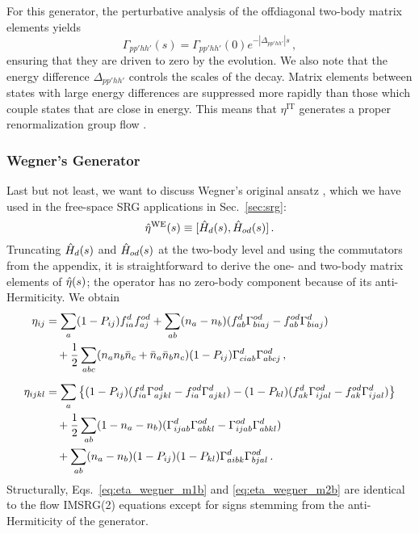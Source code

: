 {For this generator, the perturbative analysis of the offdiagonal 
two-body matrix elements yields
\begin{equation}
  \Gamma_{pp'hh'}(s) = \Gamma_{pp'hh'}(0) e^{-|\Delta_{pp'hh'}|s}\,,
\end{equation}
ensuring that they are driven to zero by the evolution. We also
note that the energy difference $\Delta_{pp'hh'}$ controls
the scales of the decay. Matrix elements between states with large 
energy differences are suppressed more rapidly than those which
couple states that are close in energy. This means that $\eta^\text{IT}$ 
generates a proper renormalization group flow \cite{Kehrein:2006kx,Hergert:2016jk}.


%
%
\subsubsection{\label{sec:imsrg_generator_wegner}Wegner's Generator}
Last but not least, we want to discuss Wegner's original ansatz 
\cite{Wegner:1994dk}, which we have used in the free-space SRG applications 
in Sec.~\ref{sec:srg}:
\begin{equation}\label{eq:eta_wegner}
  \etaO^\text{WE}(s) \equiv \comm{\HO_d(s)}{\HO_{od}(s)}\,.
\end{equation}
Truncating $\hat{H}_d(s)$ and $\hat{H}_{od}(s)$ at the two-body level and using
the commutators from the appendix, it is straightforward to derive the 
one- and two-body matrix elements of $\hat{\eta}(s)$; the operator has no
zero-body component because of its anti-Hermiticity. We obtain
\begin{align}
  \eta_{ij} &= 
  \sum_{a}(1-P_{ij})f^d_{ia}f^{od}_{aj} +\sum_{ab}(n_a-n_b)(f^d_{ab}\Gamma^{od}_{biaj}-f^{od}_{ab}\Gamma^d_{biaj}) \notag\\ 
  &\quad +\frac{1}{2} \sum_{abc}(n_an_b\bar{n}_c+\bar{n}_a\bar{n}_bn_c) (1-P_{ij})\Gamma^d_{ciab}\Gamma^{od}_{abcj}
  \label{eq:eta_wegner_m1b}\,,\\[5pt]
  \eta_{ijkl}&= 
  \sum_{a}\left\{ 
    (1-P_{ij})(f^d_{ia}\Gamma^{od}_{ajkl}-f^{od}_{ia}\Gamma^{d}_{ajkl} )
    -(1-P_{kl})(f^{d}_{ak}\Gamma^{od}_{ijal}-f^{od}_{ak}\Gamma^d_{ijal} )
    \right\}\notag \\
  &\quad+ \frac{1}{2}\sum_{ab}(1-n_a-n_b)(\Gamma^d_{ijab}\Gamma^{od}_{abkl}-\Gamma^{od}_{ijab}\Gamma^d_{abkl})\notag\\
  &\quad+ \sum_{ab}(n_a-n_b) (1-P_{ij})(1-P_{kl})\Gamma^{d}_{aibk}\Gamma^{od}_{bjal}
    \label{eq:eta_wegner_m2b}\,.
\end{align}
Structurally, Eqs.~\eqref{eq:eta_wegner_m1b} and \eqref{eq:eta_wegner_m2b} 
are identical to the flow IMSRG(2) equations except for signs stemming from 
the anti-Hermiticity of the generator. 

}
